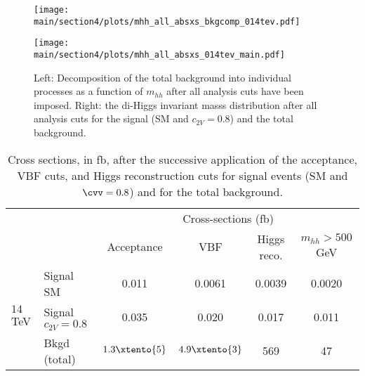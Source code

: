 \begin{figure}[h!]
	\centering
	\begin{minipage}{0.49\textwidth}\centering
		\texttt{[image: \\main/section4/plots/mhh\_all\_absxs\_bkgcomp\_014tev.pdf]}
	\end{minipage}
	\begin{minipage}{0.49\textwidth}\centering
		\texttt{[image: \\main/section4/plots/mhh\_all\_absxs\_014tev\_main.pdf]}
	\end{minipage}
	\caption{\small Left: Decomposition of the total
		background into individual processes as a function of $m_{hh}$
		after all analysis cuts have been imposed.
		Right: the di-Higgs invariant masss distribution after all analysis cuts
		for the signal (SM and $c_{2V}=0.8$) and the total background.
	}
	\label{fig:mhhdist} 
\end{figure}

\begin{table}[h]\centering
	\small
	\renewcommand{\arraystretch}{1.5}
	\begin{tabular}{llcccc}
		\toprule[0.1em]
		& & \multicolumn{4}{c}{Cross-sections (fb) } \\
		&  &  Acceptance & VBF  & Higgs reco. & $m_{hh}>500$ GeV  \\\midrule 
		\multirow{3}{*}{	{\large $14\,$TeV}} 
		& Signal SM &  0.011 & 0.0061 & 0.0039 & 0.0020 \\
		& Signal $c_{2V}=0.8$ & 0.035 & 0.020 & 0.017 & 0.011 \\
		& Bkgd (total)   & $1.3\xtento{5}$ & $4.9\xtento{3}$ & 569 & 47   \\
		\bottomrule[0.1em]
	\end{tabular} 
	\caption{\small Cross sections, in fb, after the
		successive application of the acceptance, VBF cuts, and Higgs reconstruction cuts
		for signal events (SM and  $\cvv=0.8$) and for
		the total background. \label{tab:xsecs}
	}
\end{table}

